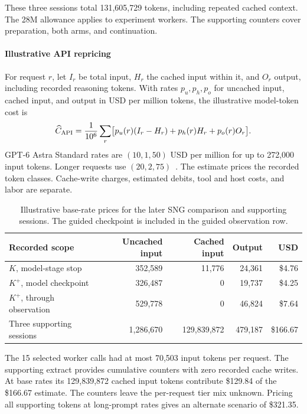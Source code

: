 These three sessions total 131,605,729 tokens, including repeated cached context. The 28M allowance applies to experiment workers. The supporting counters cover preparation, both arms, and continuation.

\paragraph{Illustrative API repricing}
For request \(r\), let \(I_r\) be total input, \(H_r\) the cached input within it, and \(O_r\) output, including recorded reasoning tokens. With rates \(p_u,p_h,p_o\) for uncached input, cached input, and output in USD per million tokens, the illustrative model-token cost is
\[
\widehat C_{\rm API}
=\frac{1}{10^6}\sum_r\bigl[p_u(r)(I_r-H_r)+p_h(r)H_r+p_o(r)O_r\bigr].
\]
GPT-6 Astra Standard rates are \((10,1,50)\) USD per million for up to 272,000 input tokens. Longer requests use \((20,2,75)\)~\cite{openaiAstraPricing2026}. The estimate prices the recorded token classes. Cache-write charges, estimated debits, tool and host costs, and labor are separate.

\begin{table}[!htbp]
\caption{Illustrative base-rate prices for the later SNG comparison and supporting sessions. The guided checkpoint is included in the guided observation row.}
\label{tab:sng-pricing}
\centering\small
\begin{tabular}{@{}p{.33\linewidth}rrrr@{}}
\toprule
Recorded scope & Uncached input & Cached input & Output & USD \\
\midrule
$K$, model-stage stop & 352,589 & 11,776 & 24,361 & \$4.76 \\
$K^{+}$, model checkpoint & 326,487 & 0 & 19,737 & \$4.25 \\
$K^{+}$, through observation & 529,778 & 0 & 46,824 & \$7.64 \\
Three supporting sessions & 1,286,670 & 129,839,872 & 479,187 & \$166.67 \\
\bottomrule
\end{tabular}
\end{table}

The 15 selected worker calls had at most 70,503 input tokens per request. The supporting extract provides cumulative counters with zero recorded cache writes. At base rates its 129,839,872 cached input tokens contribute \$129.84 of the \$166.67 estimate. The counters leave the per-request tier mix unknown. Pricing all supporting tokens at long-prompt rates gives an alternate scenario of \$321.35.

